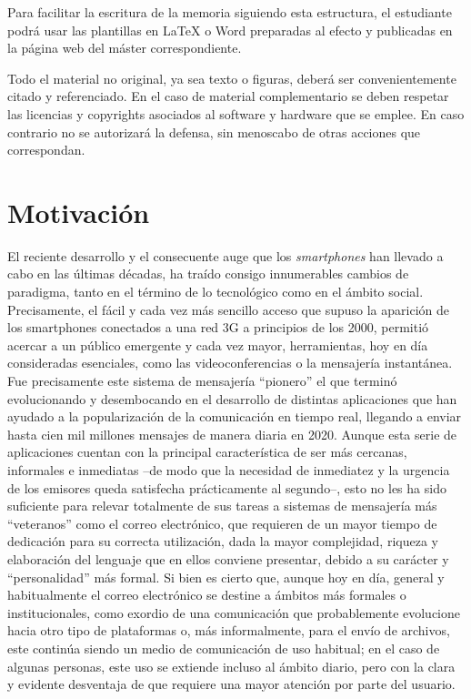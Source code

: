 Para facilitar la escritura de la memoria siguiendo esta estructura, el estudiante podrá usar las plantillas en LaTeX o Word preparadas al efecto y publicadas en la página web del máster correspondiente.

Todo el material no original, ya sea texto o figuras, deberá ser convenientemente citado y referenciado. En el caso de material complementario se deben respetar las licencias y copyrights asociados al software y hardware que se emplee. En caso contrario no se autorizará la defensa, sin menoscabo de otras acciones que correspondan.


\section{Motivación}
El reciente desarrollo y el consecuente auge que los \textit{smartphones} han llevado a cabo en las últimas décadas, ha traído consigo innumerables cambios de paradigma, tanto en el término de lo tecnológico como en el ámbito social. Precisamente, el fácil y cada vez más sencillo acceso que supuso la aparición de los smartphones conectados a una red 3G a principios de los 2000, permitió acercar a un público emergente y cada vez mayor, herramientas, hoy en día consideradas esenciales, como las videoconferencias o la mensajería instantánea. Fue precisamente este sistema de mensajería ``pionero'' el que terminó evolucionando y desembocando en el desarrollo de distintas aplicaciones que han ayudado a la popularización de la comunicación en tiempo real, llegando a enviar hasta cien mil millones mensajes de manera diaria en 2020. Aunque esta serie de aplicaciones cuentan con la principal característica de ser más cercanas, informales e inmediatas –de modo que la necesidad de inmediatez y la urgencia de los emisores queda satisfecha prácticamente al segundo–, esto no les ha sido suficiente para relevar totalmente de sus tareas a sistemas de mensajería más ``veteranos'' como el correo electrónico, que requieren de un mayor tiempo de dedicación para su correcta utilización, dada la mayor complejidad, riqueza y elaboración del lenguaje que en ellos conviene presentar, debido a su carácter y ``personalidad'' más formal. Si bien es cierto que, aunque hoy en día, general y habitualmente el correo electrónico se destine a ámbitos más formales o institucionales, como exordio de una comunicación que probablemente evolucione hacia otro tipo de plataformas o, más informalmente, para el envío de archivos, este continúa siendo un medio de comunicación de uso habitual; en el caso de algunas personas, este uso se extiende incluso al ámbito diario, pero con la clara y evidente desventaja de que requiere una mayor atención por parte del usuario.

